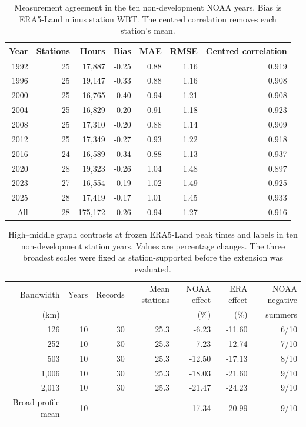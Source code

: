 \begin{table}[H]\centering
\caption{Measurement agreement in the ten non-development NOAA years. Bias is ERA5-Land minus station WBT. The centred correlation removes each station's mean.}
\label{tab:noaa-extension-measurement}\footnotesize
\begin{tabular}{rrrrrrr}\toprule
Year & Stations & Hours & Bias & MAE & RMSE & Centred correlation \\
\midrule
1992 & 25 & 17,887 & -0.25 & 0.88 & 1.16 & 0.919 \\
1996 & 25 & 19,147 & -0.33 & 0.88 & 1.16 & 0.908 \\
2000 & 25 & 16,765 & -0.40 & 0.94 & 1.21 & 0.908 \\
2004 & 25 & 16,829 & -0.20 & 0.91 & 1.18 & 0.923 \\
2008 & 25 & 17,310 & -0.20 & 0.88 & 1.14 & 0.909 \\
2012 & 25 & 17,349 & -0.27 & 0.93 & 1.22 & 0.918 \\
2016 & 24 & 16,589 & -0.34 & 0.88 & 1.13 & 0.937 \\
2020 & 28 & 19,323 & -0.26 & 1.04 & 1.48 & 0.897 \\
2023 & 27 & 16,554 & -0.19 & 1.02 & 1.49 & 0.925 \\
2025 & 28 & 17,419 & -0.17 & 1.01 & 1.45 & 0.933 \\
\midrule
All & 28 & 175,172 & -0.26 & 0.94 & 1.27 & 0.916 \\
\bottomrule\end{tabular}\end{table}

\begin{table}[H]\centering
\caption{High--middle graph contrasts at frozen ERA5-Land peak times and labels in ten non-development station years. Values are percentage changes. The three broadest scales were fixed as station-supported before the extension was evaluated.}
\label{tab:noaa-extension-effect}\footnotesize
\begin{tabular}{rrrrrrr}\toprule
Bandwidth & Years & Records & Mean stations & NOAA effect & ERA effect & NOAA negative \\
(km) & & & & (\%) & (\%) & summers \\
\midrule
126 & 10 & 30 & 25.3 & -6.23 & -11.60 & 6/10 \\
252 & 10 & 30 & 25.3 & -7.23 & -12.74 & 7/10 \\
503 & 10 & 30 & 25.3 & -12.50 & -17.13 & 8/10 \\
1,006 & 10 & 30 & 25.3 & -18.03 & -21.60 & 9/10 \\
2,013 & 10 & 30 & 25.3 & -21.47 & -24.23 & 9/10 \\
\midrule
Broad-profile mean & 10 & -- & -- & -17.34 & -20.99 & 9/10 \\
\bottomrule\end{tabular}\end{table}
